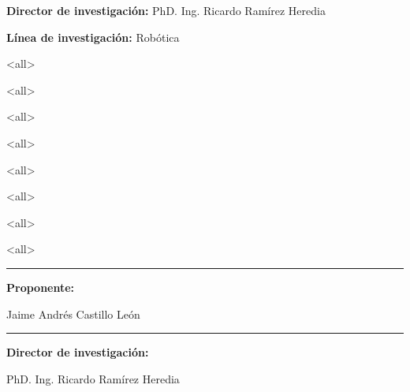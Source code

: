 \renewcommand{\tablename}{Tabla}

\maketitle
{}
{\large\textbf{Director de investigaci\'on:} PhD. Ing. Ricardo Ram\'irez Heredia}\par\vspace{0.7cm}
{\large\textbf{L\'inea de investigaci\'on:} Rob\'otica}

\mode<all>

\mode<all>

\mode<all>

\mode<all>

\mode<all>

\mode<all>

\mode<all>

\mode<all>

\mode*

\vspace{2cm}

\vspace{4cm}
\parbox[b][3cm][c]{8cm}{
\centering
\rule{7cm}{1pt}\par
\textbf{Proponente:}\par
Jaime Andr\'es Castillo Le\'on
}\par\vspace{3cm}
\parbox[b][3cm][c]{8cm}{
\centering
\rule{7cm}{1pt}\par
\textbf{Director de investigaci\'on:}\par
PhD. Ing. Ricardo Ram\'irez Heredia
}


